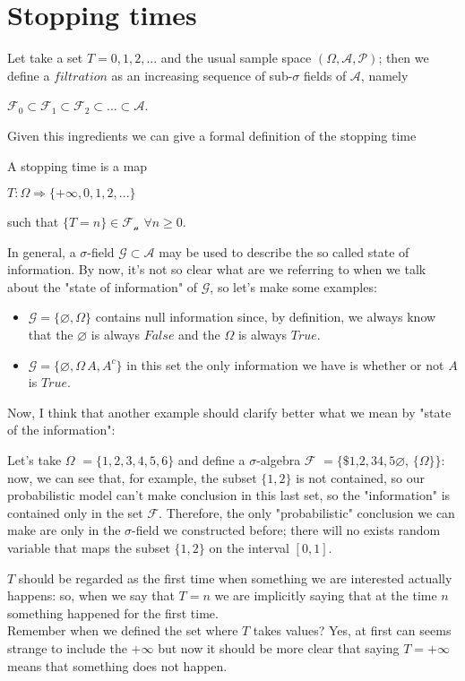 \section{Stopping times}
Let take a set $T = {0,1,2,...}$ and the usual sample space $(\Omega, \mathcal{A}, \mathcal{P})$; then we define a $filtration$ as an increasing sequence of sub-$\sigma$ fields of $\mathcal{A}$, namely
\begin{center}
    $\mathcal{F_0} \subset \mathcal{F_1} \subset \mathcal{F_2} \subset ... \subset \mathcal{A}$. 
\end{center}
Given this ingredients we can give a formal definition of the stopping time
\begin{definition}
    A stopping time is a map
    \begin{center}
        $T: \Omega \Rightarrow \{+\infty, 0, 1, 2, ...\}$
    \end{center}
    such that $\{T=n\} \in \mathcal{F_n}$ $\forall n \geq 0$.
\end{definition}
In general, a $\sigma$-field $\mathcal{G} \subset \mathcal{A}$ may be used to describe the so called state of information. By now, it's not so clear what are we referring to when we talk about the "state of information" of $\mathcal{G}$, so let's make some examples:
\begin{example}
\begin{itemize}
    \item $\mathcal{G} = \{\varnothing, \Omega \}$ contains null information since, by definition, we always know that the $\varnothing$ is always $False$ and the $\Omega$ is always $True$.
    \item $\mathcal{G} = \{\varnothing, \Omega \, A, A^c\}$ in this set the only information we have is whether or not $A$ is $True$.
\end{itemize}   
\end{example}
Now, I think that another example should clarify better what we mean by "state of the information":
\begin{example}
    Let's take $\Omega$ $= \{1,2,3,4,5,6\}$ and define a $\sigma$-algebra $\mathcal{F}$ $= \{\${1}$,${2,3}$${4,5}${$\varnothing$}, ${\{\Omega}\}\}$: now, we can see that, for example, the subset $\{1,2\}$ is not contained, so our probabilistic model can't make conclusion in this last set, so the "information" is contained only in the set $\mathcal{F}$. Therefore, the only "probabilistic" conclusion we can make are only in the $\sigma$-field we constructed before; there will no exists random variable that maps the subset $\{1,2\}$ on the interval $[0,1]$.
\end{example}
$T$ should be regarded as the first time when something we are interested actually happens: so, when we say that $T=n$ we are implicitly saying that at the time $n$ something happened for the first time. \\
Remember when we defined the set where $T$ takes values? Yes, at first can seems strange to include the $+\infty$ but now it should be more clear that saying $T = +\infty$ means that something does not happen.

